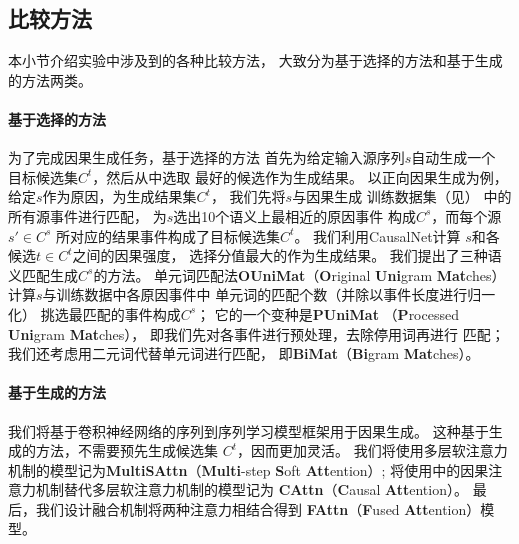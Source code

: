 \subsection{比较方法}
\label{sec:causalgen-baselines}
本小节介绍实验中涉及到的各种比较方法，
大致分为基于选择的方法和基于生成的方法两类。

\paragraph{基于选择的方法}
为了完成因果生成任务，基于选择的方法
首先为给定输入源序列$s$自动生成一个
目标候选集$C^t$，然后从中选取
最好的候选作为生成结果。
以正向因果生成为例，
给定$s$作为原因，为生成结果集$C^t$，
我们先将$s$与因果生成
训练数据集（见）
中的所有源事件进行匹配，
为$s$选出10个语义上最相近的原因事件
构成$C^s$，而每个源$s' \in C^s$
所对应的结果事件构成了目标候选集$C^t$。
我们利用CausalNet计算
$s$和各候选$t \in C^t$之间的因果强度，
选择分值最大的作为生成结果。
我们提出了三种语义匹配生成$C^s$的方法。
单元词匹配法\textbf{OUniMat}（\textbf{O}riginal \textbf{Uni}gram \textbf{Mat}ches）
计算$s$与训练数据中各原因事件中
单元词的匹配个数（并除以事件长度进行归一化）
挑选最匹配的事件构成$C^s$；
它的一个变种是\textbf{PUniMat}
（\textbf{P}rocessed \textbf{Uni}gram \textbf{Mat}ches），
即我们先对各事件进行预处理，去除停用词再进行
匹配；我们还考虑用二元词代替单元词进行匹配，
即\textbf{BiMat}（\textbf{Bi}gram \textbf{Mat}ches）。

\paragraph{基于生成的方法}
我们将基于卷积神经网络的序列到序列学习模型框架用于因果生成。
这种基于生成的方法，不需要预先生成候选集
$C^t$，因而更加灵活。
我们将使用多层软注意力机制的模型记为\textbf{MultiSAttn}（\textbf{Multi}-step \textbf{S}oft \textbf{Att}ention）;
将使用中的因果注意力机制替代多层软注意力机制的模型记为
\textbf{CAttn}（\textbf{C}ausal \textbf{Att}ention）。
最后，我们设计融合机制将两种注意力相结合得到
\textbf{FAttn}（\textbf{F}used \textbf{Att}ention）模型。


